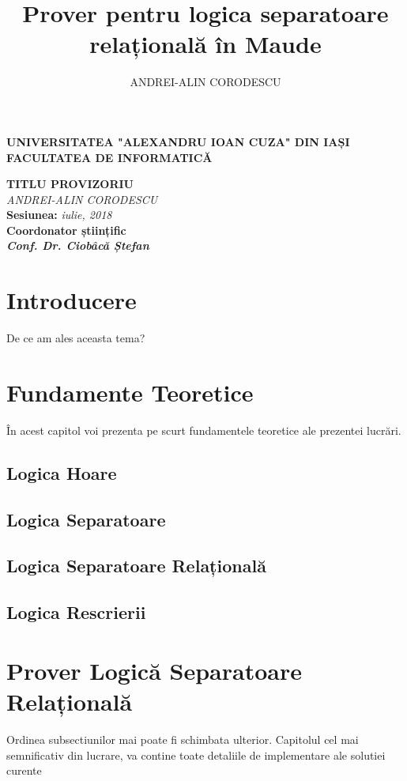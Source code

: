 \documentclass[12pt,a4paper]{article}
\author{ANDREI-ALIN CORODESCU}
\title{Prover pentru logica separatoare relațională în Maude}
\begin{document}
\begin{titlepage}
\begin{center}
\textbf{
UNIVERSITATEA "ALEXANDRU IOAN CUZA" DIN IAȘI
}
\\
\textbf{FACULTATEA DE INFORMATICĂ}
\end{center}
   \vspace{50mm}
\begin{center}
	\Large\textbf {TITLU PROVIZORIU}\\
	\vspace{30mm}
	\large\textit {ANDREI-ALIN CORODESCU}
	\\
	\vspace{20mm}
	\textbf{Sesiunea: }\textit{iulie, 2018}\\
	\vspace{30mm}
	\textbf{Coordonator științific}\\
	\textbf{\textit{Conf. Dr. Ciobâcă Ștefan}}
	\vspace{30mm}
\end{center}
\end{titlepage}
\tableofcontents

\section{Introducere}
De ce am ales aceasta tema?
\section{Fundamente Teoretice}
În acest capitol voi prezenta pe scurt fundamentele teoretice ale prezentei lucrări.
\subsection{Logica Hoare}
\subsection{Logica Separatoare}
\subsection{Logica Separatoare Relațională}
\subsection{Logica Rescrierii}
\section{Prover Logică Separatoare Relațională}
Ordinea subsectiunilor mai poate fi schimbata ulterior. Capitolul cel mai semnificativ din lucrare, va contine toate detaliile de implementare ale solutiei curente
\end{document}
